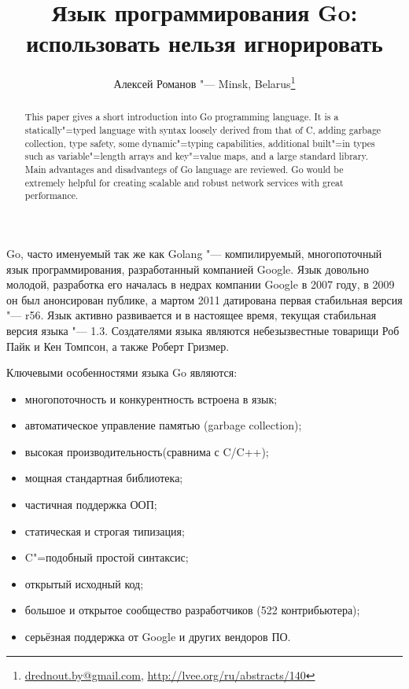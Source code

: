 \documentclass[10pt, a5paper]{article}
\begin{document}
\title{Язык программирования Go: использовать нельзя игнорировать}
\author{Алексей Романов "--- Minsk, Belarus\footnote{\url{drednout.by@gmail.com}, \url{http://lvee.org/ru/abstracts/140}}}
\maketitle
\begin{abstract}
This paper gives a short introduction into Go programming language. 
It is a statically"=typed language with syntax loosely derived from that of C, adding garbage collection, type safety, some dynamic"=typing capabilities, additional built"=in types such as variable"=length arrays and key"=value maps, and a large standard library.
Main advantages and disadvantegs of Go language are reviewed. Go would be extremely helpful for creating scalable and robust network services with great performance. 
\end{abstract}
Go, часто именуемый так же как Golang "--- компилируемый, многопоточный язык программирования, разработанный компанией \linebreak Google. Язык довольно молодой, разработка его началась в недрах компании Google в 2007 году, в 2009 он был анонсирован публике, а мартом 2011 датирована первая стабильная версия "--- r56. Язык активно развивается и в настоящее время, текущая стабильная версия языка "--- 1.3. Создателями языка являются небезызвестные товарищи Роб Пайк и Кен Томпсон, а также Роберт Гризмер.

Ключевыми особенностями языка Go являются:

\begin{itemize}
  \item многопоточность и конкурентность встроена в язык;
  \item автоматическое управление памятью (garbage collection);
  \item высокая производительность(сравнима с C/C++);
  \item мощная стандартная библиотека;
  \item частичная поддержка ООП;
  \item статическая и строгая типизация;
  \item C"=подобный простой синтаксис;
  \item открытый исходный код;
  \item большое и открытое сообщество разработчиков (522 контрибьютера);
  \item серьёзная поддержка от Google и других вендоров ПО.
\end{itemize}
\end{document}

